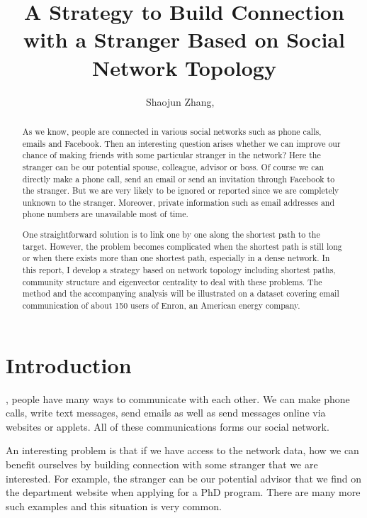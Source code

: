 \documentclass[journal]{IEEEtran}
\begin{document}
\title{A Strategy to Build Connection with a Stranger Based on Social Network Topology}
\author{Shaojun Zhang, ~}
\maketitle


\begin{abstract}
As we know, people are connected in various social networks such as phone calls, emails and Facebook. Then an interesting question arises whether we can improve our chance of making friends with some particular stranger in the network? Here the stranger can be our potential spouse, colleague, advisor or boss. Of course we can directly make a phone call, send an email or send an invitation through Facebook to the stranger. But we are very likely to be ignored or reported since we are completely unknown to the stranger. Moreover, private information such as email addresses and phone numbers are unavailable most of time.

One straightforward solution is to link one by one along the shortest path to the target. However, the problem becomes complicated when the shortest path is still long or when there exists more than one shortest path, especially in a dense network. In this report, I develop a strategy based on network topology including shortest paths, community structure and eigenvector centrality to deal with these problems. The method and the accompanying analysis will be illustrated on a dataset covering email communication of about 150 users of Enron, an American energy company.
\end{abstract}


\section{Introduction}
, people have many ways to communicate with each other. We can make phone calls, write text messages, send emails as well as send messages online via websites or applets. All of these communications forms our social network. 

An interesting problem is that if we have access to the network data, how we can benefit ourselves by building connection with some stranger that we are interested. For example, the stranger can be our potential advisor that we find on the department website when applying for a PhD program. There are many more such examples and this situation is very common.
\end{document}
